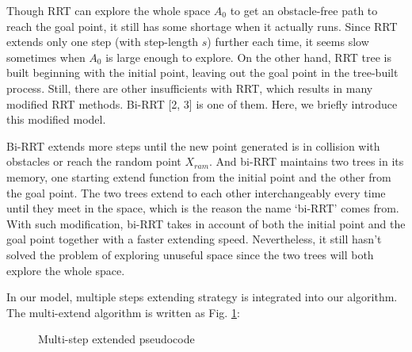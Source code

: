 \documentclass[letterpaper, 10 pt, conference]{ieeeconf}  %
\begin{document}
Though RRT can explore the whole space $A_{0}$ to get an obstacle-free path to reach the goal point, it still has some shortage when it actually runs. Since RRT extends only one step (with step-length $s$) further each time, it seems slow sometimes when $A_{0}$ is large enough to explore. On the other hand, RRT tree is built beginning with the initial point, leaving out the goal point in the tree-built process. Still, there are other insufficients with RRT, which results in many modified RRT methods. Bi-RRT [2, 3] is one of them. Here, we briefly introduce this modified model.

Bi-RRT extends more steps until the new point generated  is in collision with obstacles or reach the random point $X_{ram}$. And bi-RRT maintains two trees in its memory, one starting extend function from the initial point and the other from the goal point. The two trees extend to each other interchangeably every time until they meet in the space, which is the reason the name `bi-RRT' comes from. With such modification, bi-RRT takes in account of both the initial point and the goal point together with a faster extending speed. Nevertheless, it still hasn't solved the problem of exploring unuseful space since the two trees will both explore the whole space.

In our model, multiple steps extending strategy is integrated into our algorithm. The multi-extend algorithm is written as Fig. \ref{fig_multiExtend}:

\begin{figure}[thpb]
      \centering
      \caption{Multi-step extended pseudocode}
      \label{fig_multiExtend}
\end{figure}
\end{document}
